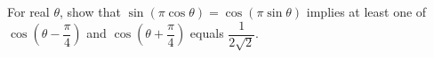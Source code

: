 For real $\theta$, show that $\sin(\pi\cos\theta)=\cos(\pi\sin\theta)$ implies at least one of $\cos (\theta - \dfrac{\pi}{4})$ and $\cos (\theta + \dfrac{\pi}{4})$ equals $\dfrac{1}{2\sqrt2}$.

